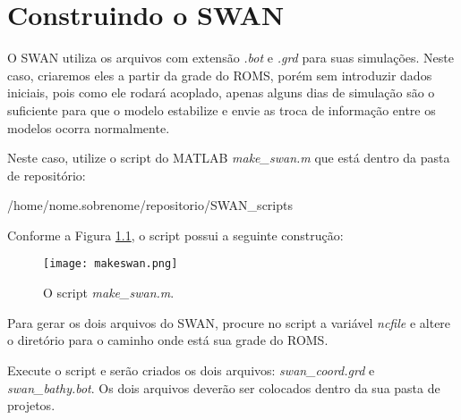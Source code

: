 \chapter{Construindo o SWAN}

\noindent O SWAN utiliza os arquivos com extensão \textit{.bot} e \textit{.grd} para suas simulações. Neste caso, criaremos eles a partir da grade do ROMS, porém sem introduzir dados iniciais, pois como ele rodará acoplado, apenas alguns dias de simulação são o suficiente para que o modelo estabilize e envie as troca de informação entre os modelos ocorra normalmente.
\bigskip

\noindent Neste caso,  utilize o script do MATLAB \textit{make\_swan.m} que está dentro da pasta de repositório:
\bigskip

\begin{bashcode}
/home/nome.sobrenome/repositorio/SWAN_scripts
\end{bashcode}
\bigskip

\noindent Conforme a Figura \textcolor{bleu_cite}{\ref{makeswan}}, o script possui a seguinte construção:
\bigskip

\begin{figure}[H]
    \centering
    \captionsetup{justification=centering}
    \texttt{[image: makeswan.png]}
    \caption{O script \textit{make\_swan.m}.}
    \label{makeswan}
\end{figure}
\bigskip

\noindent Para gerar os dois arquivos do SWAN, procure no script a variável \textit{ncfile} e altere o diretório para o caminho onde está sua grade do ROMS.
\bigskip

\noindent Execute o script e serão criados os dois arquivos: \textit {swan\_coord.grd} e \textit{swan\_bathy.bot}. Os dois arquivos deverão ser colocados dentro da sua pasta de projetos.
